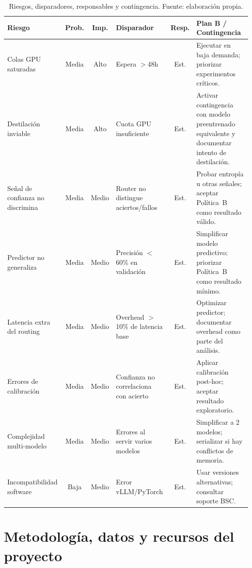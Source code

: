 \documentclass[11pt,a4paper]{article}
\begin{document}
\begin{table}[H]
\centering
\caption{Riesgos, disparadores, responsables y contingencia. Fuente: elaboración propia.}
\label{tab:risks}
\scriptsize
\setlength{\tabcolsep}{2pt}
\begin{tabularx}{\textwidth}{>{\raggedright\arraybackslash}p{2cm} c c >{\raggedright\arraybackslash}p{2.2cm} c >{\raggedright\arraybackslash}X}
\toprule
\textbf{Riesgo} & \textbf{Prob.} & \textbf{Imp.} & \textbf{Disparador} & \textbf{Resp.} & \textbf{Plan B / Contingencia} \\
\midrule
Colas GPU saturadas & Media & Alto & Espera $>$48h & Est. & Ejecutar en baja demanda; priorizar experimentos críticos. \\
\addlinespace
Destilación inviable & Media & Alto & Cuota GPU insuficiente & Est. & Activar contingencia con modelo preentrenado equivalente y documentar intento de destilación. \\
\addlinespace
Señal de confianza no discrimina & Media & Medio & Router no distingue aciertos/fallos & Est. & Probar entropía u otras señales; aceptar Política~B como resultado válido. \\
\addlinespace
Predictor no generaliza & Media & Medio & Precisión $<$60\% en validación & Est. & Simplificar modelo predictivo; priorizar Política~B como resultado mínimo. \\
\addlinespace
Latencia extra del routing & Media & Medio & Overhead $>$10\% de latencia base & Est. & Optimizar predictor; documentar overhead como parte del análisis. \\
\addlinespace
Errores de calibración & Media & Medio & Confianza no correlaciona con acierto & Est. & Aplicar calibración post-hoc; aceptar resultado exploratorio. \\
\addlinespace
Complejidad multi-modelo & Media & Medio & Errores al servir varios modelos & Est. & Simplificar a 2 modelos; serializar si hay conflictos de memoria. \\
\addlinespace
Incompatibilidad software & Baja & Medio & Error vLLM/PyTorch & Est. & Usar versiones alternativas; consultar soporte BSC. \\
\bottomrule
\end{tabularx}
\end{table}

\section{Metodología, datos y recursos del proyecto}
\label{sec:metodologia-trabajo}
\end{document}
